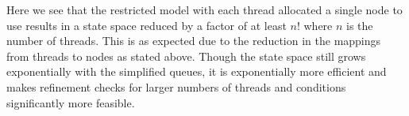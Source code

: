   Here we see that the restricted model with each thread allocated a single node to use results in a state space reduced by a factor of at least $n!$ where $n$ is the number of threads. This is as expected due to the reduction in the mappings from threads to nodes as stated above. Though the state space still grows exponentially with the simplified queues, it is exponentially more efficient and makes refinement checks for larger numbers of threads and conditions significantly more feasible.
  
  
  

  






   


  